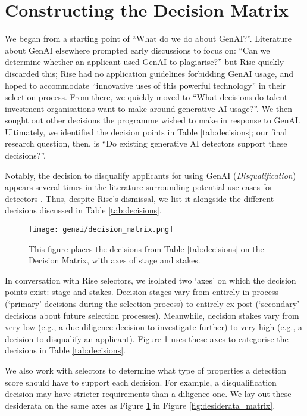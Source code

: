 \section{Constructing the Decision Matrix}\label{ssec:poi}
We began from a starting point of ``What do we do about GenAI?''. Literature about GenAI elsewhere prompted early discussions to focus on: ``Can we determine whether an applicant used GenAI to plagiarise?'' but Rise quickly discarded this; Rise had no application guidelines forbidding GenAI usage, and hoped to accommodate ``innovative uses of this powerful technology'' in their selection process. From there, we quickly moved to ``What decisions do talent investment organisations want to make around generative AI usage?''. We then sought out other decisions the programme wished to make in response to GenAI. Ultimately, we identified the decision points in Table \ref{tab:decisions}; our final research question, then, is ``Do existing generative AI detectors support these decisions?''.

Notably, the decision to disqualify applicants for using GenAI (\emph{Disqualification}) appears several times in the literature surrounding potential use cases for detectors \cite{gptzero_gptzero_2023,kalpesh_krishna_paraphrasing_2023}. Thus, despite Rise's dismissal, we list it alongside the different decisions discussed in Table \ref{tab:decisions}.

\begin{figure}[htbp]
  \centering
  \texttt{[image: genai/decision\_matrix.png]}
  \caption{This figure places the decisions from Table \ref{tab:decisions} on the Decision Matrix, with axes of stage and stakes.}
  \label{fig:decision_matrix}
\end{figure}

In conversation with Rise selectors, we isolated two `axes' on which the decision points exist: stage and stakes. Decision stages vary from entirely in process (`primary' decisions during the selection process) to entirely ex post (`secondary' decisions about future selection processes). Meanwhile, decision stakes vary from very low (e.g., a due-diligence decision to investigate further) to very high (e.g., a decision to disqualify an applicant). Figure \ref{fig:decision_matrix} uses these axes to categorise the decisions in Table \ref{tab:decisions}.

We also work with selectors to determine what type of properties a detection score should have to support each decision. For example, a disqualification decision may have stricter requirements than a diligence one. We lay out these desiderata on the same axes as Figure \ref{fig:decision_matrix} in Figure \ref{fig:desiderata_matrix}. 

